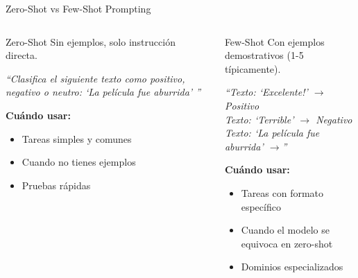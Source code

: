 \documentclass[aspectratio=169]{beamer}
\begin{document}
\begin{frame}{Zero-Shot vs Few-Shot Prompting}
    \begin{columns}[t]
        \begin{block}{Zero-Shot}
            Sin ejemplos, solo instrucción directa.
            
            \vspace{0.2cm}
            \textit{``Clasifica el siguiente texto como positivo, negativo o neutro: `La película fue aburrida' ''}
            
            \vspace{0.2cm}
            \textbf{Cuándo usar:}
            \begin{itemize}
                \item Tareas simples y comunes
                \item Cuando no tienes ejemplos
                \item Pruebas rápidas
            \end{itemize}
        \end{block}
        
        \begin{block}{Few-Shot}
            Con ejemplos demostrativos (1-5 típicamente).
            
            \vspace{0.2cm}
            \textit{``Texto: `Excelente!' $\rightarrow$ Positivo\\
            Texto: `Terrible' $\rightarrow$ Negativo\\
            Texto: `La película fue aburrida' $\rightarrow$''}
            
            \vspace{0.2cm}
            \textbf{Cuándo usar:}
            \begin{itemize}
                \item Tareas con formato específico
                \item Cuando el modelo se equivoca en zero-shot
                \item Dominios especializados
            \end{itemize}
        \end{block}
    \end{columns}
\end{frame}
\end{document}
